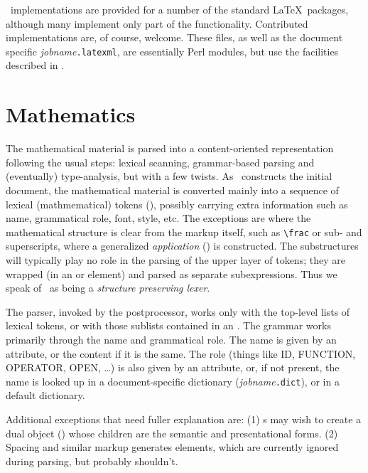 \documentclass{article}
\newcommand{\LTXConstructor}{\pkg[LaTeXML::Definition]{LaTeXML::Constructor}}
\begin{document}
\LaTeXML\ implementations are provided for a number of the standard \LaTeX\ packages,
although many implement only part of the functionality.  Contributed implementations are,
of course, welcome.  These files, as well as the document specific \textit{jobname}\texttt{.latexml},
are essentially Perl modules, but use the facilities described in .

\section{Mathematics}\label{sec:math}
The mathematical material is parsed into a content-oriented representation following
the usual steps: lexical scanning, grammar-based parsing and (eventually) type-analysis, but
with a few twists. As \LaTeXML\ constructs the initial document, the mathematical material
is converted mainly into a sequence of lexical (mathmematical) tokens (), 
possibly carrying extra information such as name, grammatical role, font, style, etc.  
The exceptions are where the mathematical structure is clear from the markup itself, 
such as \verb|\frac| or sub- and superscripts, where a generalized \emph{application} ()
is constructed.  The substructures will typically play no role in the parsing of the upper 
layer of tokens; they are wrapped (in an  or  element) and parsed
as separate subexpressions.  Thus we speak of \LaTeXML\ as being a \emph{structure preserving lexer}.  

The parser, invoked by the postprocessor, works only with the top-level lists of lexical tokens,
or with those sublists contained in an .  The grammar works primarily through
the name and grammatical role.  The name is given by an attribute, or the content if it is
the same.  The role (things like ID, FUNCTION, OPERATOR, OPEN, \ldots) is also given
by an attribute, or, if not present, the name is looked up in a document-specific
dictionary (\textit{jobname}\texttt{.dict}), or in a default dictionary.

Additional exceptions that need fuller explanation are: 
(1) \LTXConstructor s may wish to create a dual object () whose children are 
the semantic and presentational forms.
(2) Spacing and similar markup generates  elements, which are currently ignored
during parsing, but probably shouldn't.

\appendix
\end{document}
